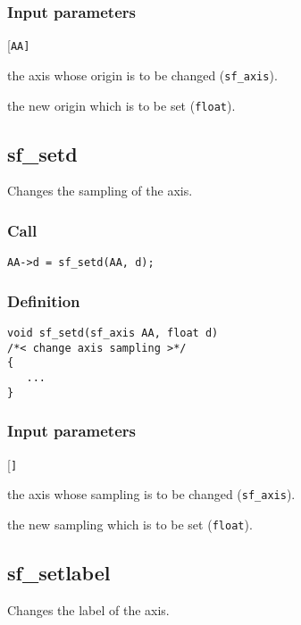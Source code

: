 \subsubsection{Input parameters}
\begin{desclist}{\tt }{\quad}[\tt AA]
   \setlength\itemsep{0pt}
   \item[AA] the axis whose origin is to be changed (\texttt{sf\_axis}).  
   \item[o]  the new origin which is to be set (\texttt{float}).  
\end{desclist}




\subsection{{sf\_setd}}
Changes the sampling of the axis.

\subsubsection*{Call}
\begin{verbatim}AA->d = sf_setd(AA, d);\end{verbatim}

\subsubsection*{Definition}
\begin{verbatim}  
void sf_setd(sf_axis AA, float d)
/*< change axis sampling >*/
{
   ...
}
\end{verbatim}

\subsubsection{Input parameters}
\begin{desclist}{\tt }{\quad}[\tt ]
   \setlength\itemsep{0pt}
   \item[AA] the axis whose sampling is to be changed (\texttt{sf\_axis}).  
   \item[o]  the new sampling which is to be set (\texttt{float}).  
\end{desclist}




\subsection{{sf\_setlabel}}
Changes the label of the axis.

